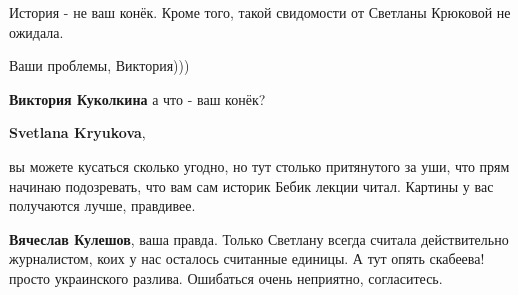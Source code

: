 \begin{itemize}
 
История - не ваш конёк. Кроме того, такой свидомости от Светланы Крюковой не ожидала.

\begin{itemize}
 
Ваши проблемы, Виктория)))


 
\textbf{Виктория Куколкина} а что - ваш конёк?

 
\textbf{Svetlana Kryukova}, 

вы можете кусаться сколько угодно, но тут столько притянутого за уши, что прям
начинаю подозревать, что вам сам историк Бебик лекции читал. Картины у вас
получаются лучше, правдивее.

 
\textbf{Вячеслав Кулешов}, ваша правда. Только Светлану всегда считала действительно журналистом, коих у нас осталось считанные единицы. А тут опять скабеева! просто украинского разлива. Ошибаться очень неприятно, согласитесь.


 

\end{itemize}
\end{itemize}
